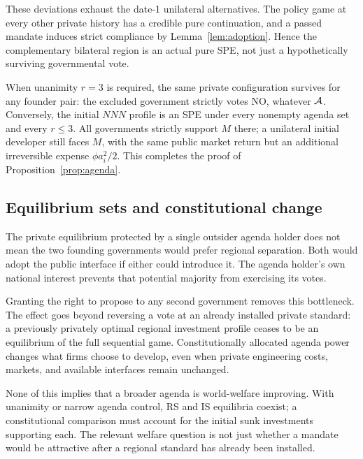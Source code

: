 These deviations exhaust the date-1 unilateral alternatives.
The policy game at every other private history has a
credible pure continuation, and a passed mandate induces
strict compliance by Lemma~\ref{lem:adoption}.
Hence the complementary bilateral region is an
actual pure SPE, not just a hypothetically surviving
governmental vote.

When unanimity \(r=3\) is required, the same private
configuration survives for any founder pair: the excluded
government strictly votes NO, whatever \(\mathcal{A}\).
Conversely, the initial \(NNN\) profile is an SPE
under every nonempty agenda set and every \(r\le3\).
All governments strictly support \(M\) there; a
unilateral initial developer still faces \(M\),
with the same public market return but an additional
irreversible expense \(\phi a_i^2/2\).
This completes the proof of Proposition~\ref{prop:agenda}.

\subsection{Equilibrium sets and constitutional change}\label{subsec:constitution}

The private equilibrium protected by a single outsider
agenda holder does not mean the two founding
governments would prefer regional separation.
Both would adopt the public interface if either
could introduce it. The agenda holder's own
national interest prevents that potential majority
from exercising its votes.

Granting the right to propose to any second government
removes this bottleneck. The effect goes beyond reversing
a vote at an already installed private standard:
a previously privately optimal regional investment
profile ceases to be an equilibrium of the
full sequential game. Constitutionally allocated
agenda power changes what firms choose to develop,
even when private engineering costs, markets, and
available interfaces remain unchanged.

None of this implies that a broader agenda is
world-welfare improving. With unanimity or narrow
agenda control, RS and IS equilibria coexist; a
constitutional comparison must account for the
initial sunk investments supporting each.
The relevant welfare question is not just whether
a mandate would be attractive after a regional
standard has already been installed.

